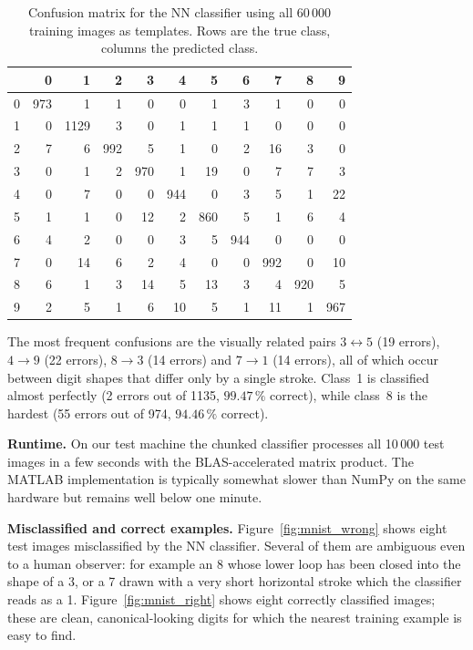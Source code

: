 \documentclass[11pt,a4paper]{article}
\begin{document}
\begin{table}[ht]
\centering
\caption{Confusion matrix for the NN classifier using all 60\,000 training images as templates. Rows are the true class, columns the predicted class.}
\label{tab:mnist_task1_conf}
\small
\begin{tabular}{c|rrrrrrrrrr}
\toprule
 & 0 & 1 & 2 & 3 & 4 & 5 & 6 & 7 & 8 & 9 \\
\midrule
0 & 973 & 1 & 1 & 0 & 0 & 1 & 3 & 1 & 0 & 0 \\
1 & 0 & 1129 & 3 & 0 & 1 & 1 & 1 & 0 & 0 & 0 \\
2 & 7 & 6 & 992 & 5 & 1 & 0 & 2 & 16 & 3 & 0 \\
3 & 0 & 1 & 2 & 970 & 1 & 19 & 0 & 7 & 7 & 3 \\
4 & 0 & 7 & 0 & 0 & 944 & 0 & 3 & 5 & 1 & 22 \\
5 & 1 & 1 & 0 & 12 & 2 & 860 & 5 & 1 & 6 & 4 \\
6 & 4 & 2 & 0 & 0 & 3 & 5 & 944 & 0 & 0 & 0 \\
7 & 0 & 14 & 6 & 2 & 4 & 0 & 0 & 992 & 0 & 10 \\
8 & 6 & 1 & 3 & 14 & 5 & 13 & 3 & 4 & 920 & 5 \\
9 & 2 & 5 & 1 & 6 & 10 & 5 & 1 & 11 & 1 & 967 \\
\bottomrule
\end{tabular}
\end{table}

The most frequent confusions are the visually related pairs $3\leftrightarrow 5$ (19 errors), $4\to 9$ (22 errors), $8\to 3$ (14 errors) and $7\to 1$ (14 errors), all of which occur between digit shapes that differ only by a single stroke. Class~1 is classified almost perfectly (2 errors out of 1135, $99.47\,\%$ correct), while class~8 is the hardest (55 errors out of 974, $94.46\,\%$ correct).

\textbf{Runtime.} On our test machine the chunked classifier processes all 10\,000 test images in a few seconds with the BLAS-accelerated matrix product. The MATLAB implementation is typically somewhat slower than NumPy on the same hardware but remains well below one minute.

\textbf{Misclassified and correct examples.} Figure~\ref{fig:mnist_wrong} shows eight test images misclassified by the NN classifier. Several of them are ambiguous even to a human observer: for example an 8 whose lower loop has been closed into the shape of a 3, or a 7 drawn with a very short horizontal stroke which the classifier reads as a 1. Figure~\ref{fig:mnist_right} shows eight correctly classified images; these are clean, canonical-looking digits for which the nearest training example is easy to find.
\end{document}
